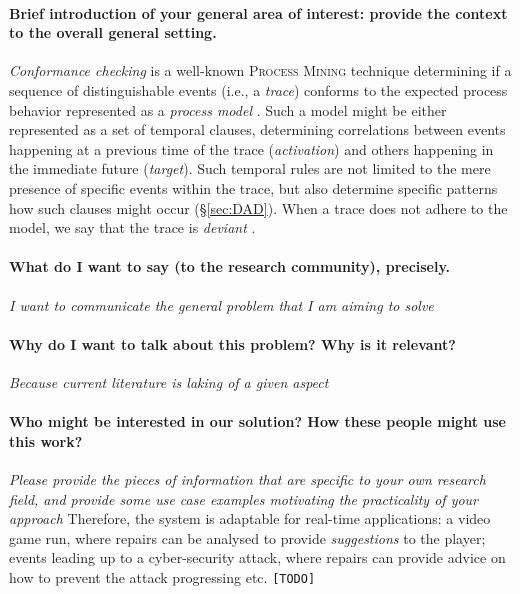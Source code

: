 \documentclass[11pt]{article}
\begin{document}
\paragraph*{Brief introduction of your general area of interest: provide the \textbf{context} to the overall general setting.}
\textit{Conformance checking} is a well-known \textsc{Process Mining} technique determining if a sequence of distinguishable events (i.e., a \textit{trace}) conforms to the expected process behavior represented as a \textit{process model} \cite{RozinatA08}. Such a model might be either represented as a set of temporal clauses, determining correlations between events happening at a previous time of the trace (\textit{activation}) and others happening in the immediate future (\textit{target}). Such temporal rules are not limited to the mere presence of specific events within the trace, but also determine specific patterns how such clauses might occur (\S\ref{sec:DAD}). When a trace does not adhere to the model, we say that the trace is \textit{deviant} \cite{bpm21}.
\medskip

\paragraph*{What do I want to say (to the research community), precisely.} \textit{I want to communicate the general problem that I am aiming to solve}
\medskip

\paragraph*{Why do I want to talk about this problem? Why is it relevant?} \textit{Because current literature is laking of a given aspect}
\medskip

\paragraph*{Who might be interested in our solution? How these people might use this work?} \textit{Please provide the pieces of information that are specific to your own research field, and provide some use case examples motivating the practicality of your approach} Therefore, the system is adaptable for real-time applications: a video game run, where repairs can be analysed to provide \emph{suggestions} to the player; events leading up to a cyber-security attack, where repairs can provide advice on how to prevent the attack progressing etc. \texttt{\color{red}[TODO]}
\medskip
\end{document}
